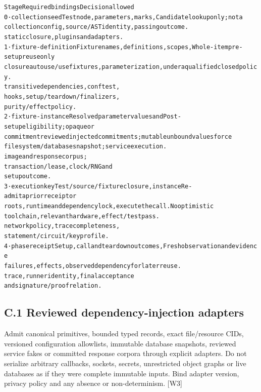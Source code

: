 \begingroup\fontsize{7}{8.4}\selectfont
\begin{alltt}
Stage                     Required bindings                          Decision allowed
0 · collection seed       Test node, parameters, marks,              Candidate lookup only; not a
                          collection config, source/AST identity,    passing outcome.
                          static closure, plugins and adapters.
1 · fixture-definition    Fixture names, definitions, scopes,        Whole-item pre-setup reuse only
closure                   autouse/usefixtures, parameterization,     under a qualified closed policy.
                          transitive dependencies, conftest,
                          hooks, setup/teardown/finalizers,
                          purity/effect policy.
2 · fixture-instance      Resolved parameter values and              Post-setup eligibility; opaque or
commitment                reviewed injected commitments;             mutable unbound values force
                          filesystem/database snapshot; service      execution.
                          image and response corpus;
                          transaction/lease, clock/RNG and
                          setup outcome.
3 · execution key         Test/source/fixture closure, instance      Re-admit a prior receipt or
                          roots, runtime and dependency lock,        execute the call. No optimistic
                          toolchain, relevant hardware, effect/      test pass.
                          network policy, trace completeness,
                          statement/circuit/key profile.
4 · phase receipt         Setup, call and teardown outcomes,         Fresh observation and evidence
                          failures, effects, observed dependency     for later reuse.
                          trace, runner identity, final acceptance
                          and signature/proof relation.
\end{alltt}\endgroup


\subsection*{C.1 Reviewed dependency-injection adapters}

Admit canonical primitives, bounded typed records, exact file/resource CIDs, versioned configuration
allowlists, immutable database snapshots, reviewed service fakes or committed response corpora
through explicit adapters. Do not serialize arbitrary callbacks, sockets, secrets, unrestricted object
graphs or live databases as if they were complete immutable inputs. Bind adapter version, privacy
policy and any absence or non-determinism. [W3]


